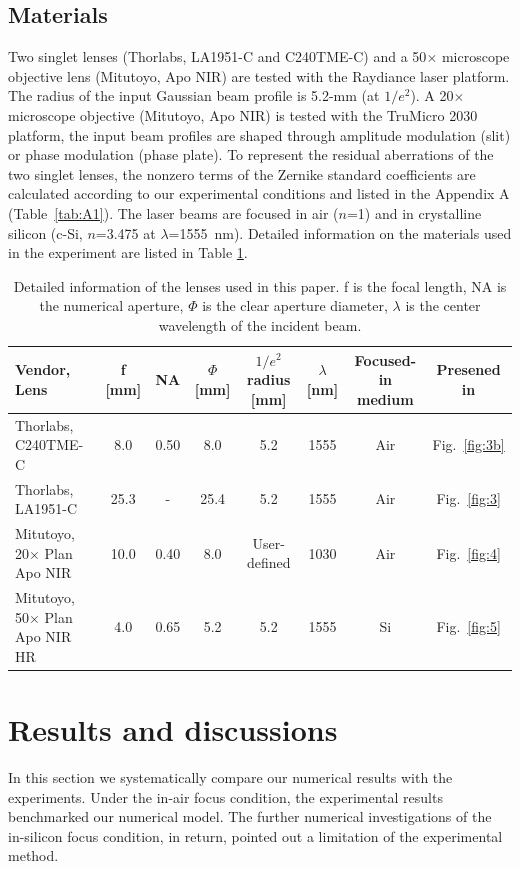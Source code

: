 \documentclass[9pt,twocolumn,twoside]{osajnl}
\begin{document}
\subsection{Materials}
Two singlet lenses (Thorlabs, LA1951-C and C240TME-C) and a 50$\times$ microscope objective lens (Mitutoyo, Apo NIR) are tested with the Raydiance laser platform. The radius of the input Gaussian beam profile is 5.2-mm (at $1/e^2$). A 20$\times$ microscope objective (Mitutoyo, Apo NIR) is tested with the TruMicro 2030 platform, the input beam profiles are shaped through amplitude modulation (slit) or phase modulation (phase plate). To represent the residual aberrations of the two singlet lenses, the nonzero terms of the Zernike standard coefficients are calculated according to our experimental conditions and listed in the Appendix A (Table~\ref{tab:A1}). The laser beams are focused in air ($n$=1) and in crystalline silicon (c-Si, $n$=3.475 at $\lambda$=1555~nm). Detailed information on the materials used in the experiment are listed in Table \ref{tab:1}.
\begin{table}
	\centering
	\begin{tabular}[c]{l c c c c c c c}
		\toprule
		\rowcolor{black!20}
		Vendor, Lens& f [mm]& NA & $\Phi$ [mm] & $1/e^2$ radius [mm] & $\lambda$ [nm]& Focused-in medium & Presened in\\
		\hline
		Thorlabs, C240TME-C & 8.0 & 0.50 & 8.0 & 5.2 & 1555 & Air & Fig.~\ref{fig:3b}\\
		\rowcolor{black!10}
		Thorlabs, LA1951-C & 25.3 & - & 25.4 & 5.2 & 1555 & Air & Fig.~\ref{fig:3} \\
		Mitutoyo, 20$\times$ Plan Apo NIR & 10.0 & 0.40 & 8.0 & User-defined & 1030 & Air & Fig.~\ref{fig:4}\\
		\rowcolor{black!10}
		Mitutoyo, 50$\times$ Plan Apo NIR HR & 4.0 & 0.65 & 5.2 & 5.2 & 1555 & Si &Fig.~\ref{fig:5}\\
		\bottomrule
	\end{tabular}	
	\caption{Detailed information of the lenses used in this paper. f is the focal length, NA is the numerical aperture, $\Phi$ is the clear aperture diameter, $\lambda$ is the center wavelength of the incident beam.}\label{tab:1}
\end{table}

\section{Results and discussions} \label{section:3}
In this section we systematically compare our numerical results with the experiments. Under the in-air focus condition, the experimental results benchmarked our numerical model. The further numerical investigations of the in-silicon focus condition, in return, pointed out a limitation of the experimental method.
\end{document}
